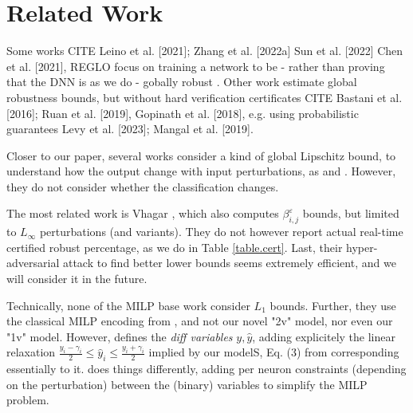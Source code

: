 \section{Related Work}

Some works CITE
Leino et al. [2021]; Zhang et al. [2022a] Sun et al. [2022]  Chen et al. [2021], REGLO focus on training a network to be - rather than proving that the DNN is as we do - gobally robust .
Other work estimate global robustness bounds, but without hard verification certificates CITE Bastani et al. [2016]; Ruan et al. [2019], Gopinath et al. [2018], e.g. using probabilistic guarantees  Levy et al. [2023]; Mangal et al. [2019].

Closer to our paper, several works consider a kind of global Lipschitz bound, to understand how the output change with input perturbations, as \cite{Marabou} and \cite{ITNE,GROCET}. However, they do not consider whether the classification changes. 

The most related work is Vhagar \cite{vhagar}, which also computes $\beta^\varepsilon_{i,j}$ bounds, but limited to $L_\infty$ perturbations (and variants). They do not however report actual 
real-time certified robust percentage, as we do in Table \ref{table.cert}. Last, their hyper-adversarial attack to find better lower bounds seems extremely efficient, and we will consider it in the future.

Technically, none of the MILP base work \cite{vhagar,ITNE,GROCET} 
consider $L_1$ bounds. Further, they use the classical MILP encoding from \cite{MILP}, and not our novel "2v" model, nor even our "1v" model. However, \cite{ITNE,GROCET} 
defines the {\em diff variables} $y,\hat{y}$, adding explicitely the linear relaxation $\frac{y_i-\gamma_i}{2} \leq \hat{y}_i \leq \frac{y_i+\gamma_i}{2}$ implied by our modelS, Eq. (3) from \cite{ITNE} corresponding essentially to it. \cite{vhagar} does things differently, adding per neuron constraints (depending on the perturbation) between the (binary) variables to simplify the MILP problem. 

